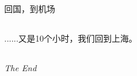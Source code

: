 ﻿\documentclass[hyperref={bookmarks=true},xcolor=pdflatex,svgnames,table,compress]{beamer}
\begin{document}
\subsection{}
\begin{frame}
\begin{center}
\end{center}
\end{frame}

\subsection{}
\begin{frame}
\begin{ztebox}
回国，到机场
\end{ztebox}
\end{frame}

\subsection{}
\begin{frame}
\end{frame}

\subsection{}
\begin{frame}
\end{frame}

\subsection{}
\begin{frame}
\end{frame}

\subsection{}
\begin{frame}
\end{frame}

\subsection{}
\begin{frame}
\begin{ztebox}
......又是10个小时，我们回到上海。
\end{ztebox}
\end{frame}

\subsection{}
\begin{frame}
\begin{ztebox}
{\itshape The End}
\end{ztebox}
\end{frame}
\end{document}
